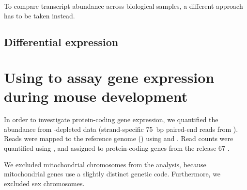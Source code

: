 To compare transcript abundance across biological samples, a different approach
has to be taken instead.

\subsection{Differential expression}

\section{Using  to assay gene expression during mouse development}

In order to investigate protein-coding gene expression, we quantified the \mrna
abundance from \rrna-depleted \rnaseq data (strand-specific \SI{75}{bp}
paired-end reads from  ). Reads were mapped to
the \mmu reference genome () using 
\citep{Fonseca:2014} and  \citep{Kim:2013}. Read counts were
quantified using  \citep{Anders:2014}, and assigned to
protein-coding genes from the  release \num{67}
\citep{Flicek:2014}.

We excluded mitochondrial chromosomes from the analysis, because mitochondrial
genes use a slightly distinct genetic code. Furthermore, we excluded
sex chromosomes.
